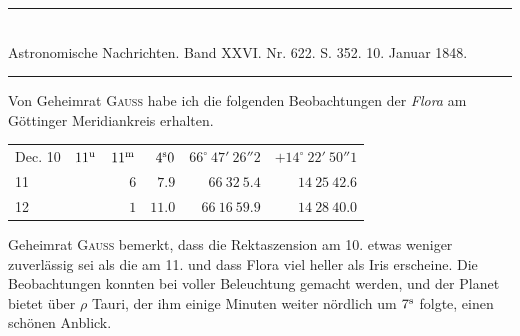 \clearpage
{}
\begin{center}
\rule{0.55\linewidth}{0.4pt}\\[2pt]
Astronomische Nachrichten. Band XXVI. Nr. 622. S. 352. 10. Januar 1848.\\[2pt]
\rule{0.55\linewidth}{0.4pt}
\end{center}

Von Geheimrat \textsc{Gauss} habe ich die folgenden Beobachtungen der \emph{Flora} am Göttinger Meridiankreis erhalten.

\begin{center}
\setlength{\tabcolsep}{4pt}
\begin{tabular}{l|r r r|r|r}
Dec. 10 & $11^{\rm u}$ & $11^{\rm m}$ & $4^{\rm s}0$ & $66^\circ\ 47'\ 26''2$ & $+14^\circ\ 22'\ 50''1$ \\
\hfill 11 & & $6$ & $7.9$ & $66\ 32\ 5.4$ & $14\ 25\ 42.6$ \\
\hfill 12 & & $1$ & $11.0$ & $66\ 16\ 59.9$ & $14\ 28\ 40.0$ \\
\end{tabular}
\end{center}

Geheimrat \textsc{Gauss} bemerkt, dass die Rektaszension am 10. etwas weniger zuverlässig sei als die am 11. und dass Flora viel heller als Iris erscheine. Die Beobachtungen konnten bei voller Beleuchtung gemacht werden, und der Planet bietet über $\rho$ Tauri, der ihm einige Minuten weiter nördlich um $7^{\rm s}$ folgte, einen schönen Anblick.

